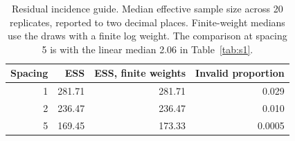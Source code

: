 \begin{table}[t]
\centering
\caption{Residual incidence guide. Median effective sample size across 20 replicates, reported to two decimal places. Finite-weight medians use the draws with a finite log weight. The comparison at spacing 5 is with the linear median 2.06 in Table~\ref{tab:s1}.}
\label{tab:s2}
{\small\setlength{\tabcolsep}{3pt}%
\begin{tabular}{rrrr}
\hline
Spacing & ESS & ESS, finite weights & Invalid proportion \\
\hline
1 & 281.71 & 281.71 & 0.029 \\
2 & 236.47 & 236.47 & 0.010 \\
5 & 169.45 & 173.33 & 0.0005 \\
\hline
\end{tabular}}
\end{table}
